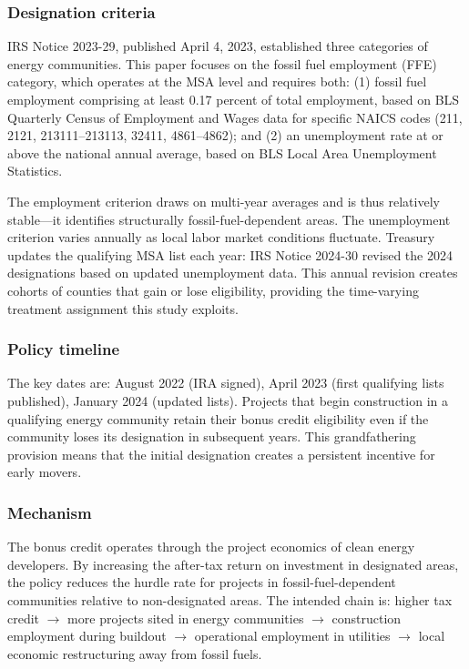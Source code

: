 \documentclass[12pt]{article}
\begin{document}
\subsubsection*{Designation criteria}
IRS Notice 2023-29, published April 4, 2023, established three categories of energy communities. This paper focuses on the fossil fuel employment (FFE) category, which operates at the MSA level and requires both: (1) fossil fuel employment comprising at least 0.17 percent of total employment, based on BLS Quarterly Census of Employment and Wages data for specific NAICS codes (211, 2121, 213111--213113, 32411, 4861--4862); and (2) an unemployment rate at or above the national annual average, based on BLS Local Area Unemployment Statistics.

The employment criterion draws on multi-year averages and is thus relatively stable---it identifies structurally fossil-fuel-dependent areas. The unemployment criterion varies annually as local labor market conditions fluctuate. Treasury updates the qualifying MSA list each year: IRS Notice 2024-30 revised the 2024 designations based on updated unemployment data. This annual revision creates cohorts of counties that gain or lose eligibility, providing the time-varying treatment assignment this study exploits.

\subsubsection*{Policy timeline}
The key dates are: August 2022 (IRA signed), April 2023 (first qualifying lists published), January 2024 (updated lists). Projects that begin construction in a qualifying energy community retain their bonus credit eligibility even if the community loses its designation in subsequent years. This grandfathering provision means that the initial designation creates a persistent incentive for early movers.

\subsubsection*{Mechanism}
The bonus credit operates through the project economics of clean energy developers. By increasing the after-tax return on investment in designated areas, the policy reduces the hurdle rate for projects in fossil-fuel-dependent communities relative to non-designated areas. The intended chain is: higher tax credit $\rightarrow$ more projects sited in energy communities $\rightarrow$ construction employment during buildout $\rightarrow$ operational employment in utilities $\rightarrow$ local economic restructuring away from fossil fuels.
\end{document}
